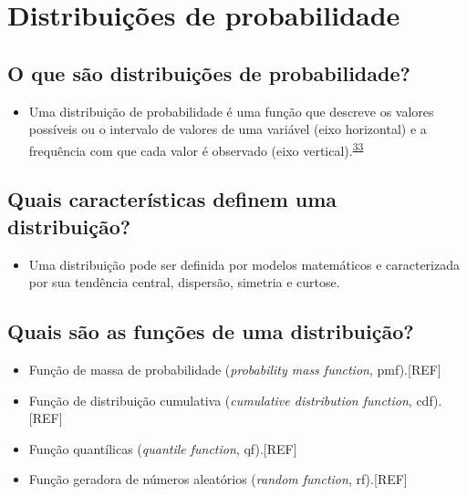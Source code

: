 \documentclass[
  a4paper,
]{book}
\providecommand{\tightlist}{%
  \setlength{\itemsep}{0pt}\setlength{\parskip}{0pt}}
\begin{document}
\hypertarget{distribuicoes}{%
\section{Distribuições de probabilidade}\label{distribuicoes}}

\hypertarget{o-que-suxe3o-distribuiuxe7uxf5es-de-probabilidade}{%
\subsection{O que são distribuições de probabilidade?}\label{o-que-suxe3o-distribuiuxe7uxf5es-de-probabilidade}}

\begin{itemize}
\tightlist
\item
  Uma distribuição de probabilidade é uma função que descreve os valores possíveis ou o intervalo de valores de uma variável (eixo horizontal) e a frequência com que cada valor é observado (eixo vertical).\textsuperscript{\protect\hyperlink{ref-vetter2017}{33}}
\end{itemize}

\hypertarget{quais-caracteruxedsticas-definem-uma-distribuiuxe7uxe3o}{%
\subsection{Quais características definem uma distribuição?}\label{quais-caracteruxedsticas-definem-uma-distribuiuxe7uxe3o}}

\begin{itemize}
\tightlist
\item
  Uma distribuição pode ser definida por modelos matemáticos e caracterizada por sua tendência central, dispersão, simetria e curtose.
\end{itemize}

\hypertarget{quais-suxe3o-as-funuxe7uxf5es-de-uma-distribuiuxe7uxe3o}{%
\subsection{Quais são as funções de uma distribuição?}\label{quais-suxe3o-as-funuxe7uxf5es-de-uma-distribuiuxe7uxe3o}}

\begin{itemize}
\item
  Função de massa de probabilidade (\emph{probability mass function}, pmf).{[}REF{]}
\item
  Função de distribuição cumulativa (\emph{cumulative distribution function}, cdf).{[}REF{]}
\item
  Função quantílicas (\emph{quantile function}, qf).{[}REF{]}
\item
  Função geradora de números aleatórios (\emph{random function}, rf).{[}REF{]}
\end{itemize}
\end{document}
